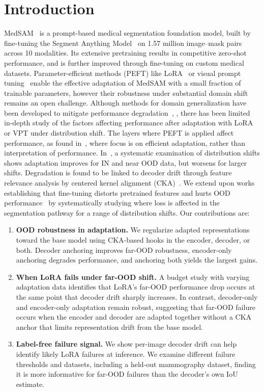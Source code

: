 \documentclass[runningheads]{llncs}
\begin{document}
\section{Introduction}
\label{sec:intro}

MedSAM~\cite{ma2024medsam} is a prompt-based medical segmentation foundation model, built by fine-tuning the Segment Anything Model~\cite{kirillov2023sam} on 1.57 million image--mask pairs across 10 modalities. Its extensive pretraining results in competitive zero-shot performance, and is further improved through fine-tuning on custom medical datasets. Parameter-efficient methods (PEFT) like LoRA~\cite{hu2022lora} or visual prompt tuning~\cite{jia2022vpt} enable the effective adaptation of MedSAM with a small fraction of trainable parameters, however their robustness under substantial domain shift remains an open challenge. Although methods for domain generalization have been developed to mitigate performance degradation~\cite{wei2024prompting}, \cite{dong2024sdp}, there has been limited in-depth study of the factors affecting performance after adaptation with LoRA or VPT under distribution shift. The layers where PEFT is applied affect performance, as found in~\cite{teuber2026peft}, where focus is on efficient adaptation, rather than interpretation of performance. In~\cite{prior2026safer}, a systematic examination of distribution shifts shows adaptation improves for IN and near OOD data, but worsens for larger shifts. Degradation is found to be linked to decoder drift through feature relevance analysis by centered kernel alignment (CKA)~\cite{kornblith2019cka}. We extend upon works establishing that fine-tuning distorts pretrained features and hurts OOD performance~\cite{kumar2022finetuning,tan2024protection} by systematically studying where loss is affected in the segmentation pathway for a range of distribution shifts. Our contributions are:
\begin{enumerate}
  \item \textbf{OOD robustness in adaptation.} We regularize adapted representations toward the base model using CKA-based hooks in the encoder, decoder, or both. Decoder anchoring improves far-OOD robustness, encoder-only anchoring degrades performance, and anchoring both yields the largest gains.
  \item \textbf{When LoRA fails under far-OOD shift.} A budget study with varying adaptation data identifies that LoRA's far-OOD performance drop occurs at the same point that decoder drift sharply increases. In contrast, decoder-only and encoder-only adaptation remain robust, suggesting that far-OOD failure occurs when the encoder and decoder are adapted together without a CKA anchor that limits representation drift from the base model.
  \item \textbf{Label-free failure signal.} We show per-image decoder drift can help identify likely LoRA failures at inference. We examine different failure thresholds and datasets, including a held-out mammography dataset, finding it is more informative for far-OOD failures than the decoder's own IoU estimate.
\end{enumerate}
\end{document}

